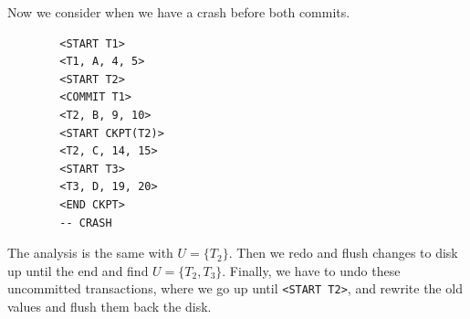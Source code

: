     \begin{example}
      \label{ex:crash-before-t2-and-t3}
      Now we consider when we have a crash before both commits. 
      \begin{lstlisting}
        <START T1>
        <T1, A, 4, 5>
        <START T2>
        <COMMIT T1>
        <T2, B, 9, 10>
        <START CKPT(T2)>
        <T2, C, 14, 15>
        <START T3>
        <T3, D, 19, 20>
        <END CKPT>
        -- CRASH
      \end{lstlisting} 
      The analysis is the same with $U = \{T_2\}$. Then we redo and flush changes to disk up until the end and find $U = \{T_2, T_3\}$. Finally, we have to undo these uncommitted transactions, where we go up until \texttt{<START T2>}, and rewrite the old values and flush them back the disk. 
    \end{example}

